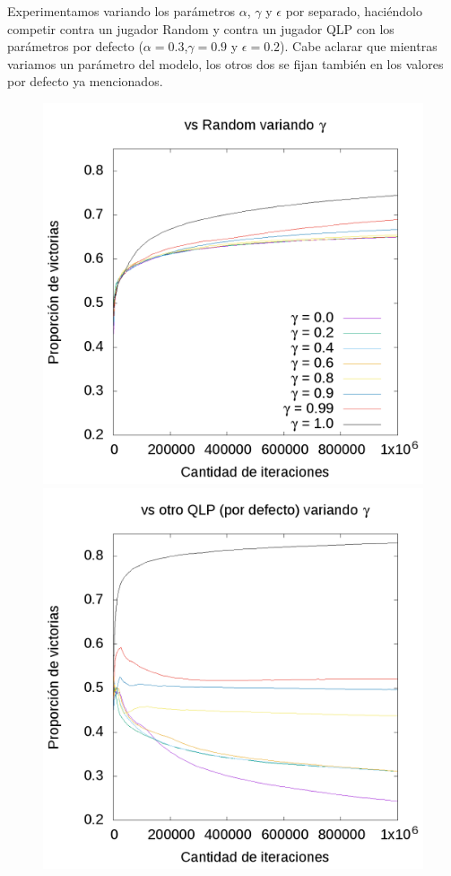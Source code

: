 \documentclass[10pt, a4paper]{article}
\begin{document}
Experimentamos variando los parámetros $\alpha$, $\gamma$ y $\epsilon$ por separado, haciéndolo competir contra un jugador Random y contra un jugador QLP con los parámetros por defecto ($\alpha=0.3$,$\gamma=0.9$ y $\epsilon=0.2$).
Cabe aclarar que mientras variamos un parámetro del modelo, los otros dos se fijan también en los valores por defecto ya mencionados.


\begin{figure}[H]
 \centering
  \begin{minipage}[c]{1\textwidth}
	\includegraphics[scale=0.2]{GammaR.png}
	\includegraphics[scale=0.2]{GammaQ.png}

\end{minipage}
\end{figure}
\end{document}
